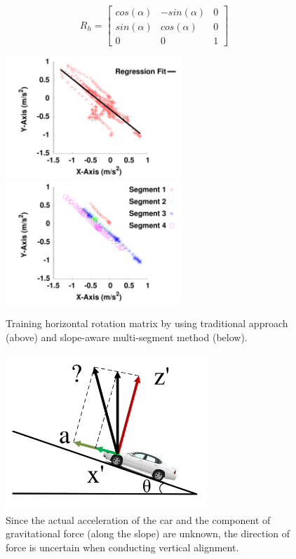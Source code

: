 \[
R_h
	=
\begin{bmatrix}
   cos(\alpha) & -sin(\alpha) & 0 \\
   sin(\alpha) & cos(\alpha) & 0 \\
   0 & 0 & 1
\end{bmatrix}
\]



\begin{figure}[ht] 
\center
\hspace{-0.4cm}
  \includegraphics[width=2.6in,angle=0]{Figs/DriveSense/slopeaware/stateoftheart.pdf}
\hspace{-0.0cm}
  \includegraphics[width=2.6in,angle=0]{Figs/DriveSense/slopeaware/direction.pdf}
\hspace{-0.0cm}
   \caption{Training horizontal rotation matrix by using traditional
approach (above) and slope-aware multi-segment method (below).}
\label{direction}
\vspace{0.4cm}
\end{figure}





\begin{figure}[ht]
\begin{center}
\includegraphics[width=3.0in, angle=0]{Figs/DriveSense/uncertain_vertical.pdf}
\vspace{0.0cm}
	\caption{
Since the actual acceleration of the car 
and the component of gravitational force (along the slope) are unknown, 
the direction of force is uncertain when conducting vertical alignment.
}
\label{training}
\vspace{0.4cm}
\end{center}
\end{figure}




